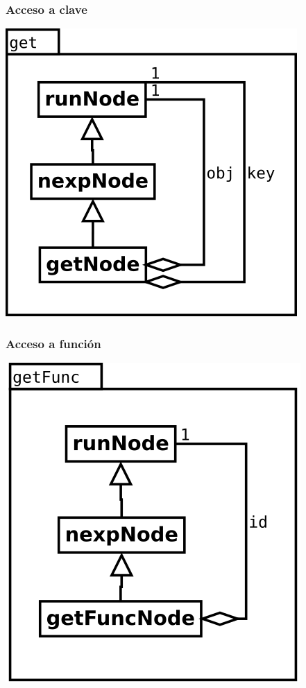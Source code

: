 \subsubsection {Acceso a clave} 
\begin{center}
\includegraphics[scale=0.4]{get.png} \\
\end{center}

\subsubsection {Acceso a función} 
\begin{center}
\includegraphics[scale=0.4]{getFunc.png} \\
\end{center}

